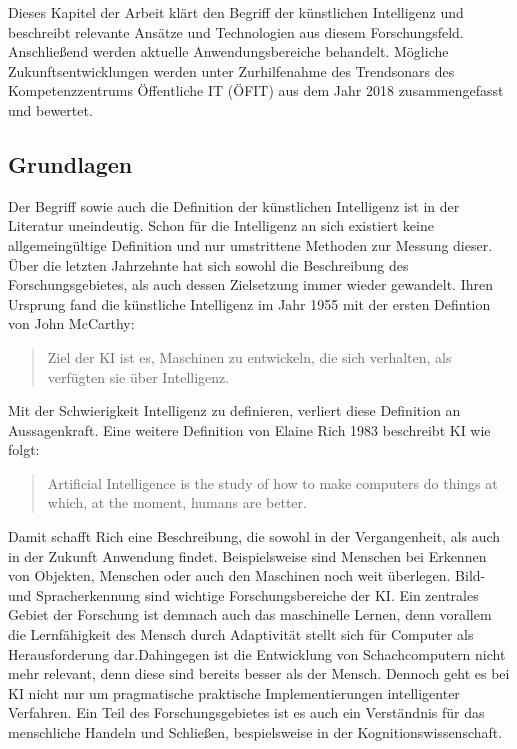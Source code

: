 \documentclass[a4paper,12pt, german]{report}
\begin{document}
Dieses Kapitel der Arbeit klärt den Begriff der künstlichen Intelligenz und beschreibt relevante Ansätze und Technologien aus diesem Forschungsfeld. Anschließend werden aktuelle Anwendungsbereiche behandelt. Mögliche Zukunftsentwicklungen werden unter Zurhilfenahme des Trendsonars des Kompetenzzentrums Öffentliche IT (ÖFIT) aus dem Jahr 2018 zusammengefasst und bewertet. 

\subsection{Grundlagen}

Der Begriff sowie auch die Definition der künstlichen Intelligenz ist in der Literatur uneindeutig. Schon für die Intelligenz an sich existiert keine allgemeingültige Definition und nur umstrittene Methoden zur Messung dieser. Über die letzten Jahrzehnte hat sich sowohl die Beschreibung des Forschungsgebietes, als auch dessen Zielsetzung immer wieder gewandelt. Ihren Ursprung fand die künstliche Intelligenz im Jahr 1955 mit der ersten Defintion von John McCarthy:
\begin{quote}
  Ziel der KI ist es, Maschinen zu entwickeln, die sich verhalten, als verfügten sie über Intelligenz.
\end{quote}
 Mit der Schwierigkeit Intelligenz zu definieren, verliert diese Definition an Aussagenkraft. Eine weitere Definition von Elaine Rich 1983 beschreibt KI wie folgt: 
 \begin{quote}
  Artificial Intelligence is the study of how to make computers do things at which, at the moment, humans are better.
 \end{quote} 
 Damit schafft Rich eine Beschreibung, die sowohl in der Vergangenheit, als auch in der Zukunft Anwendung findet. Beispielsweise sind Menschen bei Erkennen von Objekten, Menschen oder auch den Maschinen noch weit überlegen. Bild- und Spracherkennung sind wichtige Forschungsbereiche der KI.  Ein zentrales Gebiet der Forschung ist demnach auch das maschinelle Lernen, denn vorallem die Lernfähigkeit des Mensch durch Adaptivität stellt sich für Computer als Herausforderung dar.Dahingegen ist die Entwicklung von Schachcomputern nicht mehr relevant, denn diese sind bereits besser als der Mensch. Dennoch geht es bei KI nicht nur um pragmatische praktische Implementierungen intelligenter Verfahren. Ein Teil des Forschungsgebietes ist es auch ein Verständnis für das menschliche Handeln und Schließen, bespielsweise in der Kognitionswissenschaft.
\end{document}
